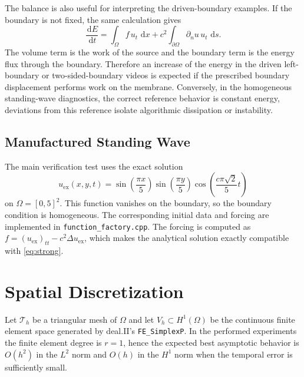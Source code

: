 \documentclass[11pt,a4paper]{article}
\newcommand{\dd}{\,\mathrm{d}}
\begin{document}
The balance is also useful for interpreting the driven-boundary examples.  If
the boundary is not fixed, the same calculation gives
\begin{equation}
\frac{\dd E}{\dd t}
=\int_\Omega f\,u_t\,\dd x
 + c^2\int_{\partial\Omega}\partial_n u\,u_t\,\dd s .
\label{eq:energy-flux}
\end{equation}
The volume term is the work of the source and the boundary term is the energy
flux through the boundary.  Therefore an increase of the energy in the driven
left-boundary or two-sided-boundary videos is expected if the prescribed boundary displacement performs work on the
membrane.  Conversely, in the homogeneous standing-wave diagnostics, the correct
reference behavior is constant energy, deviations from this reference isolate
algorithmic dissipation or instability.

\subsection{Manufactured Standing Wave}

The main verification test uses the exact solution
\begin{equation}
u_{\mathrm{ex}}(x,y,t)
= \sin\!\left(\frac{\pi x}{5}\right)
  \sin\!\left(\frac{\pi y}{5}\right)
  \cos\!\left(\frac{c\pi\sqrt2}{5}t\right)
\label{eq:standing-wave}
\end{equation}
on $\Omega=[0,5]^2$.  This function vanishes on the boundary, so the boundary
condition is homogeneous.  The corresponding initial data and forcing are
implemented in \texttt{function\_factory.cpp}.  The forcing is computed as
$f=(u_{\mathrm{ex}})_{tt}-c^2\Delta u_{\mathrm{ex}}$, which makes the
analytical solution exactly compatible with \eqref{eq:strong}.

\section{Spatial Discretization}

Let $\mathcal{T}_h$ be a triangular mesh of $\Omega$ and let
$V_h\subset H^1(\Omega)$ be the continuous finite element space generated by
deal.II's \texttt{FE\_SimplexP}.  In the performed experiments the finite
element degree is $r=1$, hence the expected best asymptotic behavior is
$O(h^2)$ in the $L^2$ norm and $O(h)$ in the $H^1$ norm when the temporal error
is sufficiently small.
\end{document}
